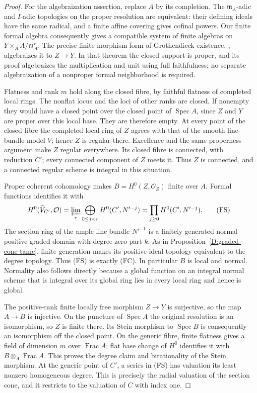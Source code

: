 \begin{proof}
For the algebraization assertion, replace $A$ by its completion.
The $\mathfrak m_A$-adic and $I$-adic topologies on the proper
resolution are equivalent: their defining ideals have the same
radical, and a finite affine covering gives cofinal powers.
Our finite formal algebra consequently gives a compatible
system of finite algebras on $Y\times_A A/\mathfrak m_A^r$.
The precise finite-morphism form of Grothendieck existence,
\cite[Lemma 30.28.2, tag 09ZT]{StacksBFiniteCone},
algebraizes it to $Z\to Y$.  In that theorem the closed support
is proper, and its proof algebraizes the multiplication and
unit using full faithfulness; no separate algebraization of
a nonproper formal neighborhood is required.

Flatness and rank $m$ hold along the closed fibre, by faithful
flatness of completed local rings.  The nonflat locus and the
loci of other ranks are closed.  If nonempty they would have
a closed point over the closed point of $\operatorname{Spec}A$,
since $Z$ and $Y$ are proper over this local base.  They are
therefore empty.  At every point of the closed fibre the
completed local ring of $Z$ agrees with that of the smooth
line-bundle model $V$; hence $Z$ is regular there.  Excellence
and the same properness argument make $Z$ regular everywhere.
Its closed fibre is connected, with reduction $C'$; every
connected component of $Z$ meets it.  Thus $Z$ is connected,
and a connected regular scheme is integral in this situation.

Proper coherent cohomology makes $B=H^0(Z,\mathcal O_Z)$ finite
over $A$.  Formal functions
\cite[Lemma 30.20.6, tag 087U]{StacksBFiniteCone}
identifies it with
\[
 H^0(\widehat V_{C'},\mathcal O)
  =\varprojlim_r\bigoplus_{0\leq j<r}H^0(C',N'^{-j})
  =\prod_{j\geq0}H^0(C',N'^{-j}).
 \tag{FS}
\]
The section ring of the ample line bundle $N'^{-1}$ is a
finitely generated normal positive graded domain with degree
zero part $k$.  As in Proposition~\ref{D:graded-cone-tame},
finite generation makes its positive-ideal topology equivalent
to the degree topology.  Thus (FS) is exactly (FC).
In particular $B$ is local and normal.  Normality also follows
directly because a global function on an integral normal
scheme that is integral over its global ring lies in every
local ring and hence is global.

The positive-rank finite locally free morphism $Z\to Y$ is
surjective, so the map $A\to B$ is injective.
On the puncture of $\operatorname{Spec}A$ the original resolution
is an isomorphism, so $Z$ is finite there.  Its Stein morphism
to $\operatorname{Spec}B$ is consequently an isomorphism off
the closed point.  On the generic fibre, finite flatness gives
a field of dimension $m$ over $\operatorname{Frac}A$; flat base
change of $H^0$ identifies it with
$B\otimes_A\operatorname{Frac}A$.  This proves the degree claim
and birationality of the Stein morphism.  At the generic point
of $C'$, a series in (FS) has valuation its least nonzero
homogeneous degree.  This is precisely the radial valuation
of the section cone, and it restricts to the valuation of $C$
with index one.
\end{proof}

